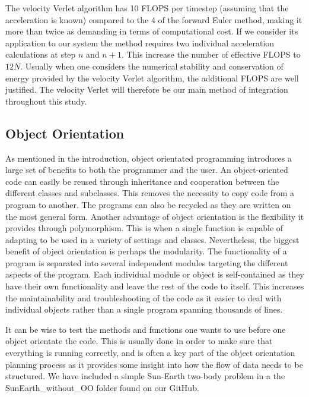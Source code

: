 \documentclass[a4paper, 10pt, reqno]{amsart}
\begin{document}
The velocity Verlet algorithm has 10 FLOPS per timestep (assuming that the acceleration is known) compared to the 4 of the forward Euler method, making it more than twice as demanding in terms of computational cost. If we consider its application to our system the method requires two individual acceleration calculations at step $n$ and $n+1$. This increase the number of effective FLOPS to $12N$. Usually when one considers the numerical stability and conservation of energy provided by the velocity Verlet algorithm, the additional FLOPS are well justified. The velocity Verlet will therefore be our main method of integration throughout this study.\\


\subsection{Object Orientation} As mentioned in the introduction, object orientated programming introduces a large set of benefits to both the programmer and the user. An object-oriented code can easily be reused through inheritance and cooperation between the different classes and subclasses. This removes the necessity to copy code from a program to another. The programs can also be recycled as they are written on the most general form. Another advantage of object orientation is the flexibility it provides through polymorphism. This is when a single function is capable of adapting to be used in a variety of settings and classes. Nevertheless, the biggest benefit of object orientation is perhaps the modularity. The functionality of a program is separated into several independent modules targeting the different aspects of the program. Each individual module or object is self-contained as they have their own functionality and leave the rest of the code to itself. This increases the maintainability and troubleshooting of the code as it easier to deal with individual objects rather than a single program spanning thousands of lines.

It can be wise to test the methods and functions one wants to use before one object orientate the code. This is usually done in order to make sure that everything is running correctly, and is often a key part of the object orientation planning process as it provides some insight into how the flow of data needs to be structured. We have included a simple Sun-Earth two-body problem in a the {SunEarth\_without\_OO} folder found on our GitHub.
\end{document}
